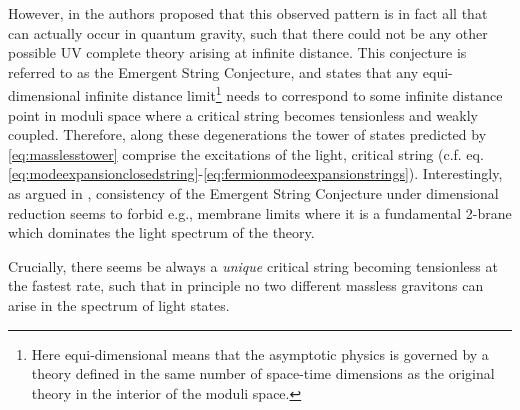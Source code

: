 However, in \cite{Lee:2019wij} the authors proposed that this observed pattern is in fact all that can actually occur in quantum gravity, such that there could not be any other possible UV complete theory arising at infinite distance. This conjecture is referred to as the Emergent String Conjecture, and states that any equi-dimensional infinite distance limit\footnote{\label{fnote:equidimensional}Here equi-dimensional means that the asymptotic physics is governed by a theory defined in the same number of space-time dimensions as the original theory in the interior of the moduli space.} needs to correspond to some infinite distance point in moduli space where a critical string becomes tensionless and weakly coupled. Therefore, along these degenerations the tower of states predicted by \eqref{eq:masslesstower} comprise the excitations of the light, critical string (c.f. eq. \eqref{eq:modeexpansionclosedstring}-\eqref{eq:fermionmodeexpansionstrings}). Interestingly, as argued in \cite{Alvarez-Garcia:2021pxo}, consistency of the Emergent String Conjecture under dimensional reduction seems to forbid e.g., membrane limits where it is a fundamental 2-brane which dominates the light spectrum of the theory.

Crucially, there seems be always a \textit{unique} critical string becoming tensionless at the fastest rate, such that in principle no two different massless gravitons can arise in the spectrum of light states.
